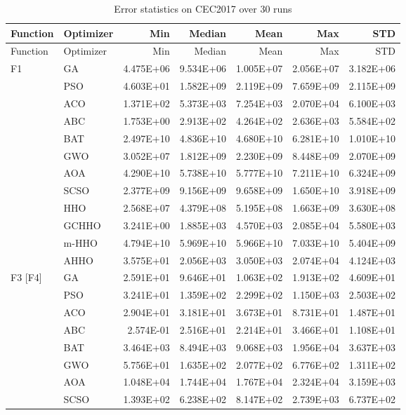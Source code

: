 \begin{longtable}{llrrrrr}
\caption{Error statistics on CEC2017 over 30 runs}\label{tab:cec2017-desc}\\
\toprule
Function & Optimizer & Min & Median & Mean & Max & STD \\
\midrule
\endfirsthead
\toprule
Function & Optimizer & Min & Median & Mean & Max & STD \\
\midrule
\endhead
\bottomrule
\endfoot
F1 & GA & 4.475E+06 & 9.534E+06 & 1.005E+07 & 2.056E+07 & 3.182E+06 \\
 & PSO & 4.603E+01 & 1.582E+09 & 2.119E+09 & 7.659E+09 & 2.115E+09 \\
 & ACO & 1.371E+02 & 5.373E+03 & 7.254E+03 & 2.070E+04 & 6.100E+03 \\
 & ABC & 1.753E+00 & 2.913E+02 & 4.264E+02 & 2.636E+03 & 5.584E+02 \\
 & BAT & 2.497E+10 & 4.836E+10 & 4.680E+10 & 6.281E+10 & 1.010E+10 \\
 & GWO & 3.052E+07 & 1.812E+09 & 2.230E+09 & 8.448E+09 & 2.070E+09 \\
 & AOA & 4.290E+10 & 5.738E+10 & 5.777E+10 & 7.211E+10 & 6.324E+09 \\
 & SCSO & 2.377E+09 & 9.156E+09 & 9.658E+09 & 1.650E+10 & 3.918E+09 \\
 & HHO & 2.568E+07 & 4.379E+08 & 5.195E+08 & 1.663E+09 & 3.630E+08 \\
 & GCHHO & 3.241E+00 & 1.885E+03 & 4.570E+03 & 2.085E+04 & 5.580E+03 \\
 & m-HHO & 4.794E+10 & 5.969E+10 & 5.966E+10 & 7.033E+10 & 5.404E+09 \\
 & AHHO & 3.575E+01 & 2.056E+03 & 3.050E+03 & 2.074E+04 & 4.124E+03 \\
\addlinespace
F3 [F4] & GA & 2.591E+01 & 9.646E+01 & 1.063E+02 & 1.913E+02 & 4.609E+01 \\
 & PSO & 3.241E+01 & 1.359E+02 & 2.299E+02 & 1.150E+03 & 2.503E+02 \\
 & ACO & 2.904E+01 & 3.181E+01 & 3.673E+01 & 8.731E+01 & 1.487E+01 \\
 & ABC & 2.574E-01 & 2.516E+01 & 2.214E+01 & 3.466E+01 & 1.108E+01 \\
 & BAT & 3.464E+03 & 8.494E+03 & 9.068E+03 & 1.956E+04 & 3.637E+03 \\
 & GWO & 5.756E+01 & 1.635E+02 & 2.077E+02 & 6.776E+02 & 1.311E+02 \\
 & AOA & 1.048E+04 & 1.744E+04 & 1.767E+04 & 2.324E+04 & 3.159E+03 \\
 & SCSO & 1.393E+02 & 6.238E+02 & 8.147E+02 & 2.739E+03 & 6.737E+02 \\

\end{longtable}
